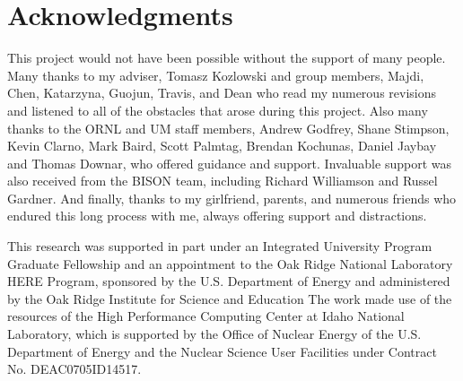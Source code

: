 \documentclass[edeposit,fullpage,11pt]{uiucthesis2009}
\begin{document}

\chapter*{Acknowledgments}

This project would not have been possible without the support of many people. 
Many thanks to my adviser, Tomasz Kozlowski and group members, Majdi, Chen, Katarzyna, Guojun, Travis, and Dean who read my numerous revisions and listened to all of the obstacles that arose during this project.
Also many thanks to the ORNL and UM staff members, Andrew Godfrey, Shane Stimpson, Kevin Clarno, Mark Baird, Scott Palmtag, Brendan Kochunas, Daniel Jaybay and Thomas Downar, who offered guidance and support.
Invaluable support was also received from the BISON team, including Richard Williamson and Russel Gardner.
And finally, thanks to my girlfriend, parents, and numerous friends who endured this long process with me, always offering support and distractions.

This research was supported in part under an Integrated University Program Graduate Fellowship and an appointment to the Oak Ridge National Laboratory HERE Program, sponsored by the U.S. Department of Energy and administered by the Oak Ridge Institute for Science and Education
The work made use of the resources of the High Performance Computing Center at Idaho National Laboratory, which is supported by the Office of Nuclear Energy of the U.S. Department of Energy and the Nuclear Science User Facilities under Contract No. DE­AC07­05ID14517.

\end{document}
